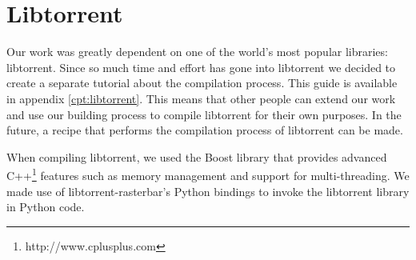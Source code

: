 \section{Libtorrent}
	Our work was greatly dependent on one of the world's most popular libraries: libtorrent. Since so much time and effort has gone into libtorrent  we decided to create a separate tutorial about the compilation process. This guide is available in appendix \ref{cpt:libtorrent}. This means that other people can extend our work and use our building process to compile libtorrent for their own purposes. In the future, a recipe that performs the compilation process of libtorrent can be made.
	
	When compiling libtorrent, we used the Boost library that provides advanced C++\footnote{http://www.cplusplus.com} features such as memory management and support for multi-threading. We made use of libtorrent-rasterbar's Python bindings to invoke the libtorrent library in Python code.
